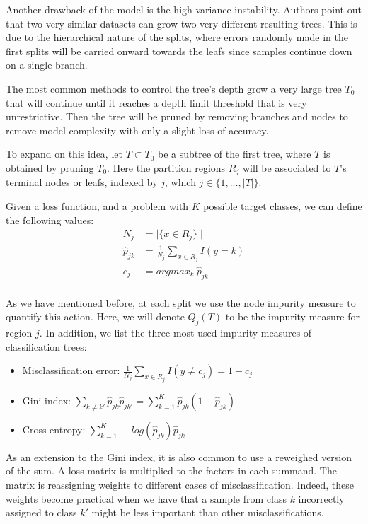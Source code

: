 Another drawback of the model is the high variance instability. Authors point out that two very similar datasets can grow two very different resulting trees. This is due to the hierarchical nature of the splits, where errors randomly made in the first splits will be carried onward towards the leafs since samples continue down on a single branch.

The most common methods to control the tree's depth grow a very large tree $T_0$ that will continue until it reaches a depth limit threshold that is very unrestrictive. Then the tree will be pruned by removing branches and nodes to remove model complexity with only  a slight loss of accuracy.

To expand on this idea, let $T \subset T_0$ be a subtree of the first tree, where $T$ is obtained by pruning $T_0$.  Here the partition regions $R_j$ will be associated to $T$'s terminal nodes or leafs, indexed by $j$, which $j \in \{1,...,|T|  \}$.

Given a loss function, and a problem with $K$ possible target classes, we can define the following values:
\begin{equation}
\begin{split}
N_j & =  \mid\{x \in R_j \}\mid\\
\hat{p}_{jk} & = \frac{1}{N_j} \sum_{x \in R_j}  I(y=k)\\
c_j & =  argmax_{k} \  \hat{p}_{jk} \\
\end{split}
\end{equation}\label{decisionTreePruneParameters}

As we have mentioned before, at each split we use the node impurity measure to quantify this action. Here, we will denote $Q_j(T)$ to be the impurity measure for region $j$. In addition, we list the three most used impurity measures of classification trees:

\begin{itemize}
\item Misclassification error: $ \displaystyle \frac{1}{N_j} \sum_{x \in R_j}  I(y\neq c_j)  = 1 - c_j $
\item Gini index: $ \displaystyle \sum_{k\neq k'} \hat{p}_{jk} \hat{p}_{jk'}   = \sum_{k=1}^{K} \hat{p}_{jk} (1 - \hat{p}_{jk})  $
\item Cross-entropy: $ \displaystyle \sum_{k=1}^{K} -log(\hat{p}_{jk})\hat{p}_{jk} $
\end{itemize}


As an extension to the Gini index, it is also common to use a reweighed version of the sum. A loss matrix is multiplied to the factors in each summand. The matrix is reassigning weights to different cases of misclassification. Indeed, these weights become practical when we have that a sample from class $k$ incorrectly assigned to class $k'$ might be less important than other misclassifications.


